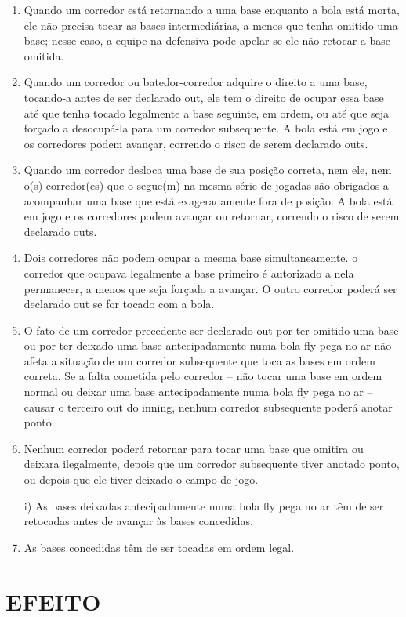 \begin{enumerate}[label=(\alph*)]
	\item  Quando um corredor está retornando a uma base enquanto a bola está morta, ele não precisa tocar as bases intermediárias, a menos que tenha omitido uma base; nesse caso, a equipe na defensiva pode apelar se ele não retocar a base omitida.
	\item  Quando um corredor ou batedor-corredor adquire o direito a uma base, tocando-a antes de ser declarado \gls{out}, ele tem o direito de ocupar essa base  até que tenha tocado legalmente a base seguinte, em ordem, ou até que seja  forçado a desocupá-la para um corredor subsequente. A bola está em jogo e os  corredores podem avançar, correndo o risco de serem declarado \gls{out}s.
	\item  Quando um corredor desloca uma base de sua posição correta, nem ele, nem  o(s) corredor(es) que o segue(m) na mesma série de jogadas são obrigados a  acompanhar uma base que está exageradamente fora de posição. A bola está em jogo e os corredores podem avançar ou retornar, correndo o risco de serem declarado \gls{out}s.
	\item  Dois corredores não podem ocupar a mesma base simultaneamente. o corredor que ocupava legalmente a base primeiro é autorizado a nela permanecer, a menos que seja forçado a avançar. O outro corredor poderá ser declarado \gls{out} se for tocado com a bola.
	\item   O fato de um corredor precedente ser declarado \gls{out} por ter omitido uma base ou por ter deixado uma base antecipadamente numa bola \gls{fly} pega no ar não afeta a situação de um corredor subsequente que toca as bases em ordem correta. Se a falta cometida pelo corredor -- não tocar uma base em ordem normal ou deixar uma base antecipadamente numa bola \gls{fly} pega no ar -- causar o terceiro \gls{out} do \gls{inning}, nenhum corredor subsequente poderá
	anotar ponto.
	\item   Nenhum corredor poderá retornar para tocar uma base que omitira ou deixara ilegalmente, depois que um corredor subsequente tiver anotado ponto, ou depois  que ele tiver deixado o campo de jogo.

	i) As bases deixadas antecipadamente numa bola \gls{fly} pega no ar têm de ser retocadas antes de avançar às bases concedidas.

	\item   As bases concedidas têm de ser tocadas em ordem legal.
\end{enumerate}

\section*{EFEITO}

